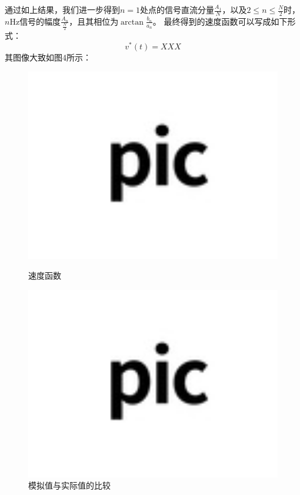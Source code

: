 \documentclass[bwprint]{cumcmthesis}
\begin{document}
        通过如上结果，我们进一步得到$n=1$处点的信号直流分量$\frac{A_1}{N}$，以及$2\leq n\leq \frac{N}{2}$时，$n\mathrm{Hz}$信号的幅度$\frac{A_n}{\frac{N}{2}}$，且其相位为$\arctan\frac{b_n}{a_n}$。
        最终得到的速度函数可以写成如下形式：
        \begin{equation*}
            v^*(t)=XXX
        \end{equation*}
        其图像大致如图4所示：
        \begin{figure}
            \begin{minipage}{0.4\linewidth}
            \centering
            \includegraphics[width=1\textwidth]{test.jpg}
            \caption{速度函数}
            \end{minipage} 
            \hfill
            \begin{minipage}{0.4\linewidth}
            \centering
            \includegraphics[width=1\textwidth]{test.jpg}
            \caption{模拟值与实际值的比较}
            \end{minipage}
        \end{figure}  
\end{document}

